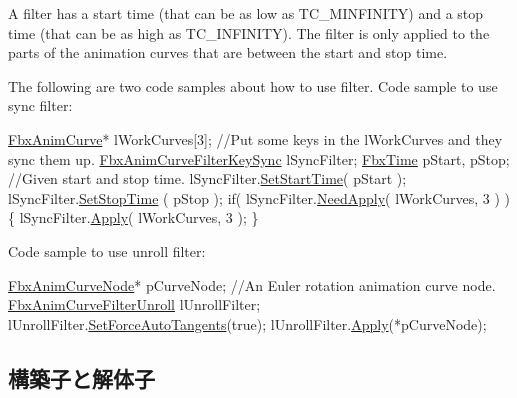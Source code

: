 A filter has a start time (that can be as low as T\+C\+\_\+\+M\+I\+N\+F\+I\+N\+I\+TY) and a stop time (that can be as high as T\+C\+\_\+\+I\+N\+F\+I\+N\+I\+TY). The filter is only applied to the parts of the animation curves that are between the start and stop time.

The following are two code samples about how to use filter. Code sample to use sync filter\+: 
\begin{DoxyCode}
\hyperlink{class_fbx_anim_curve}{FbxAnimCurve}* lWorkCurves[3]; \textcolor{comment}{//Put some keys in the lWorkCurves and they sync them up.}
\hyperlink{class_fbx_anim_curve_filter_key_sync}{FbxAnimCurveFilterKeySync} lSyncFilter;
\hyperlink{class_fbx_time}{FbxTime} pStart, pStop; \textcolor{comment}{//Given start and stop time.}
lSyncFilter.\hyperlink{class_fbx_anim_curve_filter_ad5833e1664b9621b4bafef76944ad383}{SetStartTime}( pStart );
lSyncFilter.\hyperlink{class_fbx_anim_curve_filter_a75fd5bf41a315dd12d8efb3184a17fc8}{SetStopTime} ( pStop  );
\textcolor{keywordflow}{if}( lSyncFilter.\hyperlink{class_fbx_anim_curve_filter_key_sync_a987ccf74bf3bdf7828812067d895950c}{NeedApply}( lWorkCurves, 3 ) )
\{
    lSyncFilter.\hyperlink{class_fbx_anim_curve_filter_key_sync_a4eb3dd7372f7747bcae1be8722db75e0}{Apply}( lWorkCurves, 3 );
\}
\end{DoxyCode}


Code sample to use unroll filter\+: 
\begin{DoxyCode}
\hyperlink{class_fbx_anim_curve_node}{FbxAnimCurveNode}* pCurveNode; \textcolor{comment}{//An Euler rotation animation curve node.}
\hyperlink{class_fbx_anim_curve_filter_unroll}{FbxAnimCurveFilterUnroll} lUnrollFilter;
lUnrollFilter.\hyperlink{class_fbx_anim_curve_filter_unroll_ae4d857f9f855136c18103315e473bbc3}{SetForceAutoTangents}(\textcolor{keyword}{true});
lUnrollFilter.\hyperlink{class_fbx_anim_curve_filter_unroll_ae9b4807d576e93ae4800c1764f2aabda}{Apply}(*pCurveNode);
\end{DoxyCode}
 

\subsection{構築子と解体子}
\mbox{\label{class_fbx_anim_curve_filter_ac908ea01d9d49a263be450e760dabcce}} 
